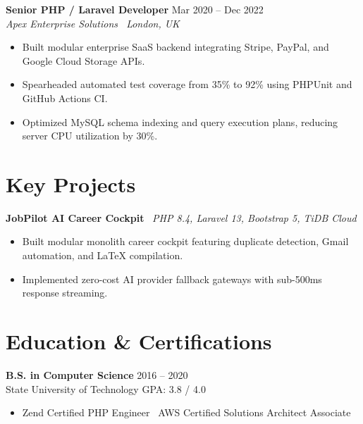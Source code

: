 \documentclass[10pt,a4paper]{article}
\begin{document}
\vspace{3pt}
\textbf{Senior PHP / Laravel Developer} \hfill Mar 2020 -- Dec 2022\\
\textit{Apex Enterprise Solutions \textbar\ London, UK}
\begin{itemize}
    \item Built modular enterprise SaaS backend integrating Stripe, PayPal, and Google Cloud Storage APIs.
    \item Spearheaded automated test coverage from 35\% to 92\% using PHPUnit and GitHub Actions CI.
    \item Optimized MySQL schema indexing and query execution plans, reducing server CPU utilization by 30\%.
\end{itemize}

\section{Key Projects}
\textbf{JobPilot AI Career Cockpit} \textbar\ \textit{PHP 8.4, Laravel 13, Bootstrap 5, TiDB Cloud}
\begin{itemize}
    \item Built modular monolith career cockpit featuring duplicate detection, Gmail automation, and LaTeX compilation.
    \item Implemented zero-cost AI provider fallback gateways with sub-500ms response streaming.
\end{itemize}

\section{Education \& Certifications}
\textbf{B.S. in Computer Science} \hfill 2016 -- 2020\\
State University of Technology \hfill GPA: 3.8 / 4.0
\begin{itemize}
    \item Zend Certified PHP Engineer \textbar\ AWS Certified Solutions Architect Associate
\end{itemize}
\end{document}

